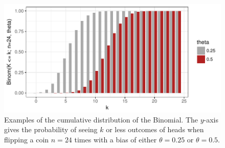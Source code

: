 \documentclass[nobib,nofonts]{tufte-handout}
\renewcommand{\markdef}[1]{\emph{#1}}
\begin{document}
\begin{example}
\begin{figure}
  \centering
  \includegraphics[width=\textwidth]{00-pics/05_00_binomial-distribution-cumulative.pdf}
  \caption{Examples of the cumulative distribution of the Binomial. The $y$-axis gives the
    probability of seeing $k$ or less outcomes of heads when flipping a coin $n=24$ times with
    a bias of either $\theta = 0.25$ or $\theta = 0.5$.}
  \label{fig:BinomialDistributionCumulative}
\end{figure}

\end{example}


\end{document}
